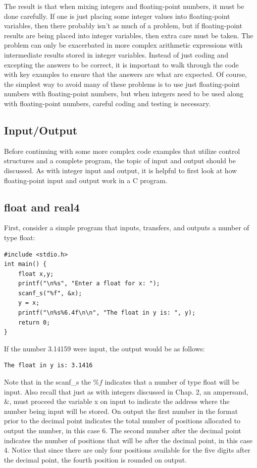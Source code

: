 \documentclass[10pt]{book}
\begin{document}
The result is that when mixing integers and floating-point numbers, it must be done carefully. If one is just placing some integer values into floating-point variables, then there probably isn't as much of a problem, but if floating-point results are being placed into integer variables, then extra care must be taken. The problem can only be exacerbated in more complex arithmetic expressions with intermediate results stored in integer variables. Instead of just coding and excepting the answers to be correct, it is important to walk through the code with key examples to ensure that the answers are what are expected. Of course, the simplest way to avoid many of these problems is to use just floating-point numbers with floating-point numbers, but when integers need to be used along with floating-point numbers, careful coding and testing is necessary.

\subsection{Input/Output}
Before continuing with some more complex code examples that utilize control structures and a complete program, the topic of input and output should be discussed. As with integer input and output, it is helpful to first look at how floating-point input and output work in a C program.

\subsection{float and real4}
First, consider a simple program that inputs, transfers, and outputs a number of type float:
\begin{verbatim}
#include <stdio.h>
int main() {
    float x,y;
    printf("\n%s", "Enter a float for x: ");
    scanf_s("%f", &x);
    y = x;
    printf("\n%s%6.4f\n\n", "The float in y is: ", y);
    return 0;
}
\end{verbatim}

If the number 3.14159 were input, the output would be as follows:

\begin{verbatim}
The float in y is: 3.1416
\end{verbatim}

Note that in the scanf\_s the $\% f$ indicates that a number of type float will be input. Also recall that just as with integers discussed in Chap. 2, an ampersand, $\&$, must proceed the variable x on input to indicate the address where the number being input will be stored. On output the first number in the format prior to the decimal point indicates the total number of positions allocated to output the number, in this case 6. The second number after the decimal point indicates the number of positions that will be after the decimal point, in this case 4. Notice that since there are only four positions available for the five digits after the decimal point, the fourth position is rounded on output.
\end{document}
